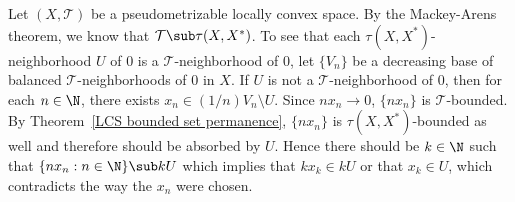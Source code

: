 \begin{example}
Let $(X,\mathcal{T})$ be a pseudometrizable locally convex space. By the Mackey-Arens theorem, we know that $\mathcal{T}\sub\tau(X,X^*)$. To see that each $\tau(X,X^*)$-neighborhood $U$ of $0$ is a $\mathcal{T}$-neighborhood of $0$, let $\{V_n\}$ be a decreasing base of balanced $\mathcal{T}$-neighborhoods of $0$ in $X$. If $U$ is not a $\mathcal{T}$-neighborhood of $0$, then for each $n\in\N$, there exists $x_n\in(1/n)V_n\setminus U$. Since $nx_n\to 0$, $\{nx_n\}$ is $\mathcal{T}$-bounded. By Theorem~\ref{LCS bounded set permanence}, $\{nx_n\}$ is $\tau(X,X^*)$-bounded as well and therefore should be absorbed by $U$. Hence there should be $k\in\N$ such that $\{nx_n:n\in\N\}\sub kU$ which implies that
$kx_k\in kU$ or that $x_k\in U$, which contradicts the way the $x_n$ were chosen.
\end{example}
